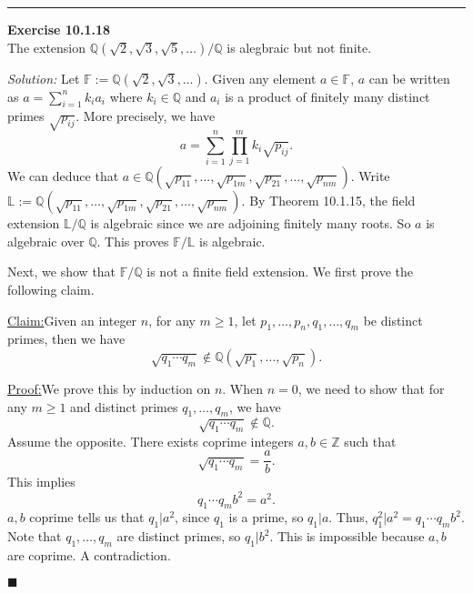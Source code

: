 \documentclass[a4paper, 12pt]{article}
\newenvironment{problem}[2][Exercise]
    { \begin{mdframed}[backgroundcolor=gray!20] \textbf{#1 #2} \\}
    {  \end{mdframed}}
\newenvironment{solution}
    {\textit{Solution:}}
    {}
\newenvironment{claim}[1]{\par\noindent\underline{Claim:}\space#1}{}
\newenvironment{claimproof}[1]{\par\noindent\underline{Proof:}\space#1}{\hfill $\blacksquare$}
\begin{document}
\noindent\rule{7in}{2.8pt}
\begin{problem}{10.1.18}
The extension \(\mathbb{Q}(\sqrt{2},\sqrt{3},\sqrt{5},\ldots)/\mathbb{Q}\) is alegbraic but not finite.
\end{problem}
\begin{solution}
Let \(\mathbb{F}:=\mathbb{Q}(\sqrt{2},\sqrt{3},\ldots)\). Given any element \(a\in \mathbb{F}\), \(a\) can be written as \(a=\sum_{i=1}^{n}k_ia_i\) where \(k_i\in \mathbb{Q}\) and \(a_i\) is a product of finitely many 
distinct primes \(\sqrt{p_{ij}}\). More precisely, we have 
\[a=\sum_{i=1}^{n}\prod_{j=1}^{m}k_i\sqrt{p_{ij}}.\]
We can deduce that \(a\in \mathbb{Q}(\sqrt{p_{11}},\ldots,\sqrt{p_{1m}},\sqrt{p_{21}},\ldots,\sqrt{p_{nm}})\). Write \(\mathbb{L}:=\mathbb{Q}(\sqrt{p_{11}},\ldots,\sqrt{p_{1m}},\sqrt{p_{21}},\ldots,\sqrt{p_{nm}})\). By Theorem 10.1.15, the field 
extension \(\mathbb{L}/\mathbb{Q}\) is algebraic since we are adjoining finitely many roots. So \(a\) is algebraic over \(\mathbb{Q}\). This proves \(\mathbb{F}/\mathbb{L}\) is algebraic. 

Next, we show that \(\mathbb{F}/\mathbb{Q}\) is not a finite field extension. We first prove the following claim.
\begin{claim}
Given an integer \(n\), for any \(m\geq 1\), let \(p_1,\ldots,p_n,q_1,\ldots,q_m\) be distinct primes, then we have 
\[\sqrt{q_1\cdots q_m}\notin \mathbb{Q}(\sqrt{p_1},\ldots,\sqrt{p_n}).\]
\end{claim}
\begin{claimproof}
We prove this by induction on \(n\). When \(n=0\), we need to show that for any \(m\geq 1\) and distinct primes \(q_1,\ldots, q_m\), we have 
\[\sqrt{q_1\cdots q_m}\notin \mathbb{Q}.\]
Assume the opposite. There exists coprime integers \(a,b\in \mathbb{Z}\) such that 
\[\sqrt{q_1\cdots q_m}=\frac{a}{b}.\]
This implies 
\[q_1\cdots q_m b^2=a^2.\] 
\(a,b\) coprime tells us that \(q_1|a^2\), since \(q_1\) is a prime, so \(q_1|a\). Thus, \(q_1^2|a^2=q_1\cdots q_m b^2\). Note that \(q_1,\ldots, q_m\) are distinct primes, so \(q_1|b^2\). This is impossible because \(a,b\) are coprime. A contradiction. 


\end{claimproof}
\end{solution}
\end{document}

